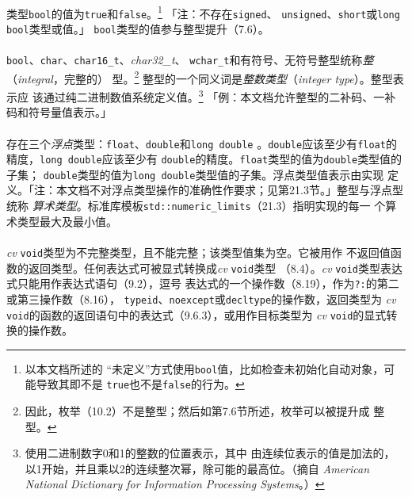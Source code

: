 \paragraph{}
类型\texttt{bool}的值为\texttt{true}和\texttt{false}。\footnote{以本文档所述的
``未定义''方式使用\texttt{bool}值，比如检查未初始化自动对象，可能导致其即不是
\texttt{true}也不是\texttt{false}的行为。} 「注：不存在\texttt{signed}、
\texttt{unsigned}、\texttt{short}或\texttt{long} \texttt{bool}类型或值。」
\texttt{bool}类型的值参与整型提升（7.6）。

\paragraph{}
\texttt{bool}、\texttt{char}、\texttt{char16\_t}、\textit{char32\_t}、
\texttt{wchar\_t}和有符号、无符号整型统称\textit{整}（\textit{integral}，完整的）
型。\footnote{因此，枚举（10.2）不是整型；然后如第7.6节所述，枚举可以被提升成
整型。} 整型的一个同义词是\textit{整数类型}（\textit{integer type}）。整型表示应
该通过纯二进制数值系统定义值。\footnote{使用二进制数字0和1的整数的位置表示，其中
由连续位表示的值是加法的，以1开始，并且乘以2的连续整次幂，除可能的最高位。（摘自
\textit{American National Dictionary for Information Processing Systems}。）}
「例：本文档允许整型的二补码、一补码和符号量值表示。」

\paragraph{}
存在三个\textit{浮点}类型：\texttt{float}、\texttt{double}和\texttt{long double}
。\texttt{double}应该至少有\texttt{float}的精度，\texttt{long double}应该至少有
\texttt{double}的精度。\texttt{float}类型的值为\texttt{double}类型值的子集；
\texttt{double}类型的值为\texttt{long double}类型值的子集。浮点类型值表示由实现
定义。「注：本文档不对浮点类型操作的准确性作要求；见第21.3节。」整型与浮点型统称
\textit{算术类型}。标准库模板\texttt{std::numeric\_limits}（21.3）指明实现的每一
个算术类型最大及最小值。

\paragraph{}
\textit{cv} \texttt{void}类型为不完整类型，且不能完整；该类型值集为空。它被用作
不返回值函数的返回类型。任何表达式可被显式转换成\textit{cv} \texttt{void}类型
（8.4）。\textit{cv} \texttt{void}类型表达式只能用作表达式语句（9.2），逗号
表达式的一个操作数（8.19），作为\texttt{?:}的第二或第三操作数（8.16），
\texttt{typeid}、\texttt{noexcept}或\texttt{decltype}的操作数，返回类型为
\textit{cv} \texttt{void}的函数的返回语句中的表达式（9.6.3），或用作目标类型为
\textit{cv} \texttt{void}的显式转换的操作数。

